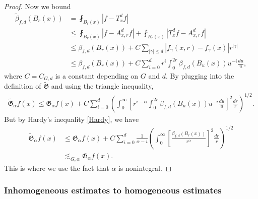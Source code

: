 \documentclass[11pt,reqno]{amsart}
\newcommand{\1}{\mathbf 1}
\begin{document}
\begin{proof}
Now we bound
\begin{align*}
\tilde{\beta}_{f,d}\left(B_r\left(x\right)\right)&=\fint_{B_r\left(x\right)}\left|f-T^d_{x}f\right|\\
&\le \fint_{B_r\left(x\right)}\left|f-A^d_{x,r}f\right|+\fint_{B_r\left(x\right)}\left|T^d_{x}f-A^d_{x,r}f\right|\\
&\le \beta_{f,d}\left(B_r\left(x\right)\right)+C\sum_{\left|\gamma\right|\le d}\left|f_\gamma\left(x,r\right)-f_\gamma \left(x\right)\right|r^{\left|\gamma\right|}\\
&\le \beta_{f,d}\left(B_r\left(x\right)\right)+C\sum_{i=0}^d r^i \int_0^{2r} \beta_{f,d}\left(B_u\left(x\right)\right)u^{-i}\frac{du}{u},
\end{align*}
where $C=C_{G,d}$ is a constant depending on $G$ and $d$.
By plugging into the definition of $\tilde{\mathfrak{G}}$ and using the triangle inequality,
\begin{align*}
    \tilde{\mathfrak{G}}_\alpha f\left(x\right)\le \mathfrak{G}_\alpha f\left(x\right)+C\sum_{i=0}^d \left(\int_0^\infty \left[r^{i-\alpha} \int_0^{2r} \beta_{f,d}\left(B_u\left(x\right)\right)u^{-i}\frac{du}{u}\right]^{2}\frac{dr}{r}\right)^{1/2}.
\end{align*}
But by Hardy's inequality \eqref{Hardy}, we have
\begin{align*}
    \tilde{\mathfrak{G}}_\alpha f\left(x\right)&\le \mathfrak{G}_\alpha f\left(x\right)+C\sum_{i=0}^d \frac{1}{\alpha-i}\left(\int_0^\infty \left[\frac{\beta_{f,d}\left(B_r\left(x\right)\right)}{r^\alpha}\right]^2 \frac{dr}{r}\right)^{1/2}\\
    &\lesssim_{G,\alpha} \mathfrak{G}_\alpha f\left(x\right).
\end{align*}
This is where we use the fact that $\alpha$ is nonintegral.
\end{proof}

\subsubsection{Inhomogeneous estimates to homogeneous estimates}\label{subsubsec:scaling}
\end{document}
